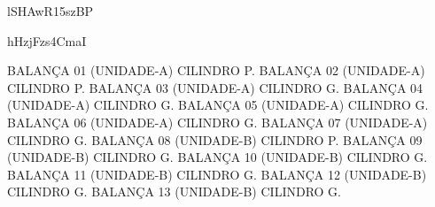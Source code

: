 lSHAwR15szBP



hHzjFzs4CmaI

BALANÇA 01 (UNIDADE-A) CILINDRO P.
BALANÇA 02 (UNIDADE-A) CILINDRO P.
BALANÇA 03 (UNIDADE-A) CILINDRO G.
BALANÇA 04 (UNIDADE-A) CILINDRO G.
BALANÇA 05 (UNIDADE-A) CILINDRO G.
BALANÇA 06 (UNIDADE-A) CILINDRO G.
BALANÇA 07 (UNIDADE-A) CILINDRO G.
BALANÇA 08 (UNIDADE-B) CILINDRO P.
BALANÇA 09 (UNIDADE-B) CILINDRO G.
BALANÇA 10 (UNIDADE-B) CILINDRO G.
BALANÇA 11 (UNIDADE-B) CILINDRO G.
BALANÇA 12 (UNIDADE-B) CILINDRO G.
BALANÇA 13 (UNIDADE-B) CILINDRO G.
